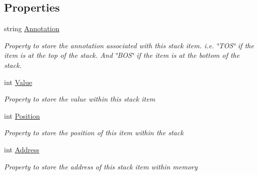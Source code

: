 \subsection*{Properties}
\begin{DoxyCompactItemize}
\item 
string \hyperlink{class_c_p_u___o_s___simulator_1_1_c_p_u_1_1_stack_item_a13f182fa7a19bcb7d78aadbd4cc04c98}{Annotation}
\begin{DoxyCompactList}\small\item\em Property to store the annotation associated with this stack item. i.\+e. \char`\"{}\+T\+O\+S\char`\"{} if the item is at the top of the stack. And \char`\"{}\+B\+O\+S\char`\"{} if the item is at the bottom of the stack. \end{DoxyCompactList}\item 
int \hyperlink{class_c_p_u___o_s___simulator_1_1_c_p_u_1_1_stack_item_ac8e518e9111640d56d59efbff2fa3161}{Value}
\begin{DoxyCompactList}\small\item\em Property to store the value within this stack item \end{DoxyCompactList}\item 
int \hyperlink{class_c_p_u___o_s___simulator_1_1_c_p_u_1_1_stack_item_aa2e46f703d2a81a32d38f12df3718909}{Position}
\begin{DoxyCompactList}\small\item\em Property to store the position of this item within the stack \end{DoxyCompactList}\item 
int \hyperlink{class_c_p_u___o_s___simulator_1_1_c_p_u_1_1_stack_item_a44f4c5bd346e25e81c54b01012768bc5}{Address}
\begin{DoxyCompactList}\small\item\em Property to store the address of this stack item within memory \end{DoxyCompactList}\end{DoxyCompactItemize}
